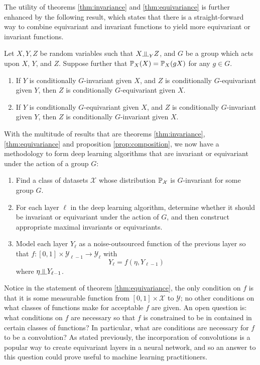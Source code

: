 The utility of theorems \ref{thm:invariance} and \ref{thm:equivariance} is further enhanced by the following result, which states that there is a straight-forward way to combine equivariant and invariant functions to yield more equivariant or invariant functions.
\begin{proposition} \label{prop:composition}
Let $X,Y,Z$ be random variables such that $X \indep_Y Z$, and $G$ be a group which acts upon $X$, $Y$, and $Z$.
Suppose further that $\mathbb{P}_X(X) = \mathbb{P}_X(gX)$ for any $g \in G$.
\begin{enumerate}
	\item
	If $Y$ is conditionally $G$-invariant given $X$, and $Z$ is conditionally $G$-equivariant given $Y$, then $Z$ is conditionally $G$-equivariant given $X$.
	
	\item
	If $Y$ is conditionally $G$-equivariant given $X$, and $Z$ is conditionally $G$-invariant given $Y$, then $Z$ is conditionally $G$-invariant given $X$.
\end{enumerate}
\end{proposition}

With the multitude of results that are theorems \ref{thm:invariance}, \ref{thm:equivariance} and proposition \ref{prop:composition}, we now have a methodology to form deep learning algorithms that are invariant or equivariant under the action of a group $G$:
\begin{enumerate}
	\item Find a class of datasets $\mathcal{X}$ whose distribution $\mathbb{P}_{\mathcal{X}}$ is $G$-invariant for some group $G$.
	\item For each layer $\ell$ in the deep learning algorithm, determine whether it should be invariant or equivariant under the action of $G$, and then construct appropriate maximal invariants or equivariants.
	\item Model each layer $Y_{\ell}$ as a noise-outsourced function of the previous layer so that $f: [0,1] \times \mathcal{Y}_{\ell-1} \to \mathcal{Y}_{\ell}$ with
	$$
		Y_{\ell} = f(\eta, Y_{\ell-1})
	$$
	where $\eta \indep Y_{\ell-1}$.

\end{enumerate}
Notice in the statement of theorem \ref{thm:equivariance}, the only condition on $f$ is that it is some measurable function from $[0,1]\times \mathcal{X}$ to $\mathcal{Y}$; no other conditions on what classes of functions make for acceptable $f$ are given.
An open question is: what conditions on $f$ are necessary so that $f$ is constrained to be in contained in certain classes of functions?
In particular, what are conditions are necessary for $f$ to be a convolution?
As stated previously, the incorporation of convolutions is a popular way to create equivariant layers in a neural network, and so an answer to this question could prove useful to machine learning practitioners. 

